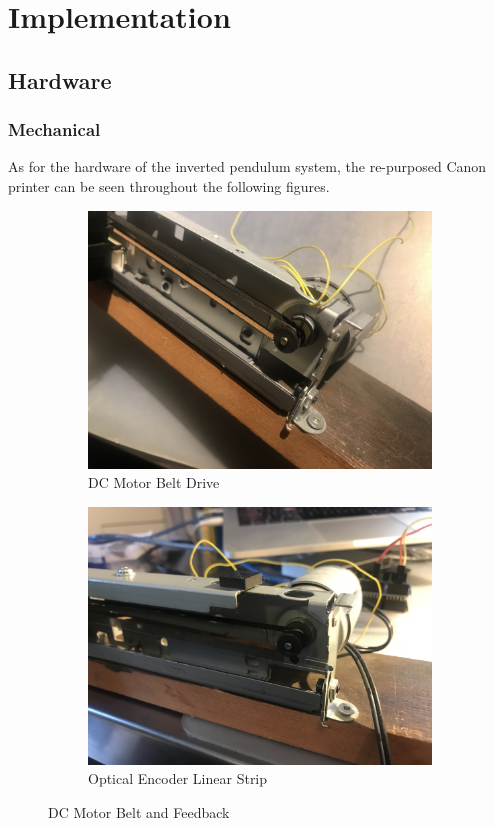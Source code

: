 \documentclass[12pt]{article}
\begin{document}
\section{Implementation}
\subsection{Hardware}
\subsubsection{Mechanical}
As for the hardware of the inverted pendulum system, the re-purposed Canon printer can be seen throughout the following figures.

\begin{figure}[H]
\centering
\begin{subfigure}{.5\textwidth}
  \centering
  \includegraphics[width=1\linewidth]{figures/IMG_5674.jpg}
  \caption{DC Motor Belt Drive}
  \label{fig:dc}
\end{subfigure}%
\begin{subfigure}{.5\textwidth}
  \centering
  \includegraphics[width=1\linewidth]{figures/IMG_5807.jpg}
  \caption{Optical Encoder Linear Strip}
  \label{fig:opt}
\end{subfigure}
\caption{DC Motor Belt and Feedback}
\end{figure}
\end{document}
